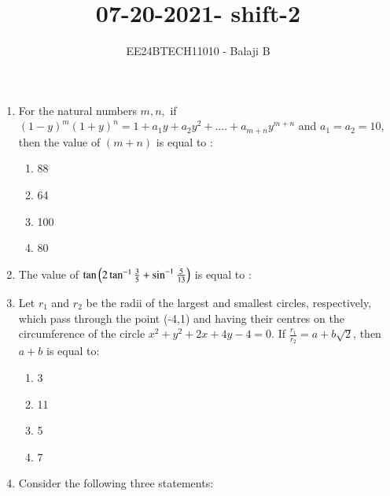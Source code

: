 \documentclass[journal]{IEEEtran}
\begin{document}

\vspace{3cm}

\title{07-20-2021- shift-2}
\author{EE24BTECH11010 - Balaji B}
{\let\newpage\relax\maketitle}
 \begin{enumerate}
    \item For the natural numbers $m,n,$ if $(1-y)^m (1+y)^n = 1 + a_1y + a_2 y^2 + .... + a_{m+n} y^{m+n}$ and $a_1 = a_2 = 10 $, then the value of $(m+n)$ is equal to :
    \begin{enumerate}
        \item 88
        \item 64
        \item 100
        \item 80
    \end{enumerate}
    \item The value of $\tan\left(2\tan^{-1}\frac{3}{5}+ \sin^{-1}\frac{5}{13}\right)$ is equal to :
    \begin{enumerate}
    \end{enumerate}
    \item  Let $r_1$ and $r_2$ be the radii of the largest and smallest circles, respectively, which pass through the point (-4,1) and having their centres on the circumference of the circle $x^2 + y^2 + 2x + 4y - 4 = 0$. If $\frac{r_1}{r_2} = a + b\sqrt{2} $, then $a+b$ is equal to:
    \begin{enumerate}
        \item 3
        \item 11
        \item 5
        \item 7 
    \end{enumerate}
    \item Consider the following three statements: \\

\end{enumerate}
\end{document}
